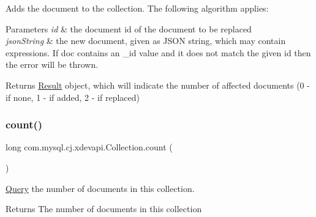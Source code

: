 Adds the document to the collection. The following algorithm applies\+:


\begin{DoxyParams}{Parameters}
{\em id} & the document id of the document to be replaced \\
\hline
{\em json\+String} & the new document, given as J\+S\+ON string, which may contain expressions. If doc contains an \+\_\+id value and it does not match the given id then the error will be thrown. \\
\hline
\end{DoxyParams}
\begin{DoxyReturn}{Returns}
\mbox{\hyperlink{interfacecom_1_1mysql_1_1cj_1_1xdevapi_1_1_result}{Result}} object, which will indicate the number of affected documents (0 -\/ if none, 1 -\/ if added, 2 -\/ if replaced) 
\end{DoxyReturn}
\mbox{\label{interfacecom_1_1mysql_1_1cj_1_1xdevapi_1_1_collection_a515922bba92c3d82c776095a2692dcd2}} 
\subsubsection{\texorpdfstring{count()}{count()}}
{\footnotesize\ttfamily long com.\+mysql.\+cj.\+xdevapi.\+Collection.\+count (\begin{DoxyParamCaption}{ }\end{DoxyParamCaption})}

\mbox{\hyperlink{interfacecom_1_1mysql_1_1cj_1_1_query}{Query}} the number of documents in this collection.

\begin{DoxyReturn}{Returns}
The number of documents in this collection 
\end{DoxyReturn}
\mbox{\label{interfacecom_1_1mysql_1_1cj_1_1xdevapi_1_1_collection_a3c707f2c50914f02347a05dcfa8e77d7}} 
